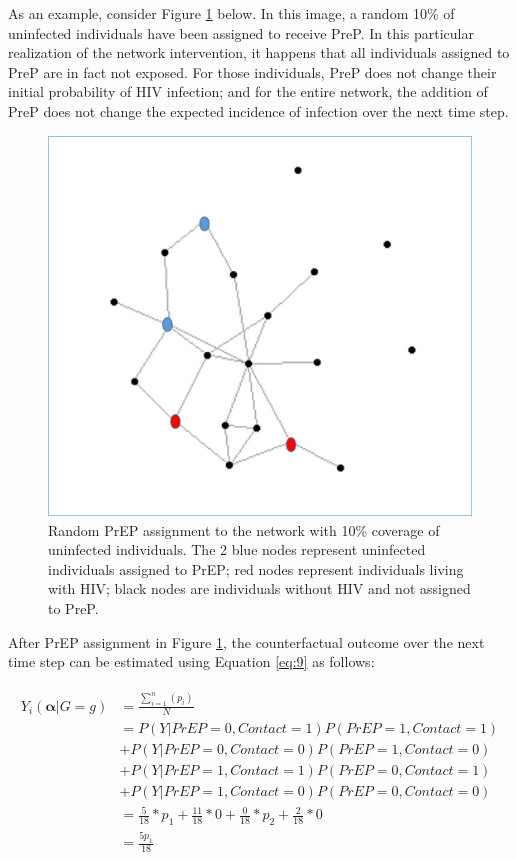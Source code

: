 \documentclass{article}
\theoremstyle{definition}
\begin{document}
As an example, consider Figure \ref{fig: Figure 3}  below. In this image, a random 10\% of uninfected individuals have been assigned to receive PreP. In this particular realization of the network intervention, it happens that all individuals assigned to PreP are in fact not exposed. For those individuals, PreP does not change their initial probability of HIV infection; and for the entire network, the addition of PreP does not change the expected incidence of infection over the next time step.
\begin{figure}[H]
    \centering
    \includegraphics[scale=0.5]{Original Figures/Network Example 2.png}
    \caption{Random PrEP assignment to the network with 10\% coverage of uninfected individuals. The 2 blue nodes represent uninfected individuals assigned to PrEP; red nodes represent individuals living with HIV; black nodes are individuals without HIV and not assigned to PreP.}
    \label{fig: Figure 3}
\end{figure}

After PrEP assignment in Figure \ref{fig: Figure 3}, the counterfactual outcome over the next time step can be estimated using Equation \ref{eq:9} as follows:

\begin{align}
\begin{split}
Y_{i}\left(\mathbf{\alpha}|G=g\right) & = \frac{\sum_{i=1}^{n}(p_{i})}{N}  \\ 
& = P\left(Y|PrEP = 0, Contact = 1\right)P\left(PrEP = 1, Contact = 1\right)  \\ \nonumber
& +P\left(Y|PrEP = 0, Contact = 0\right)P\left(PrEP = 1, Contact = 0\right)  \\ \nonumber
& +P\left(Y|PrEP = 1, Contact = 1\right)P\left(PrEP = 0, Contact = 1\right) \\ \nonumber
&  +P\left(Y|PrEP = 1, Contact = 0\right)P\left(PrEP = 0, Contact = 0\right) \\ \nonumber
 &=  \frac{5}{18}*p_1 +  \frac{11}{18}*0 +\frac{0}{18}*p_2 +  \frac{2}{18}*0 \\ \nonumber
 &=\frac{5p_1}{18}  \nonumber
\end{split}
\end{align}
\end{document}
